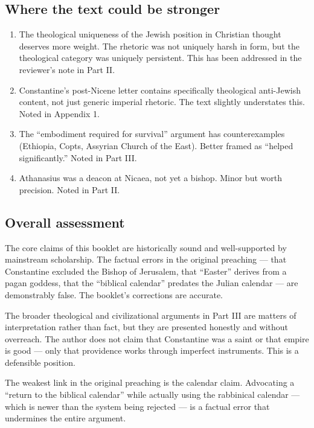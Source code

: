\documentclass[10pt,twoside,openany]{book}
\begin{document}
\subsection{Where the text could be stronger}

\begin{enumerate}[leftmargin=1.5em]
\item The theological uniqueness of the Jewish position in Christian
     thought deserves more weight. The rhetoric was not uniquely harsh
     in form, but the theological category was uniquely persistent.
     This has been addressed in the reviewer's note in Part II.

\item Constantine's post-Nicene letter contains specifically theological
     anti-Jewish content, not just generic imperial rhetoric. The text
     slightly understates this. Noted in Appendix 1.

\item The ``embodiment required for survival'' argument has
     counterexamples (Ethiopia, Copts, Assyrian Church of the East).
     Better framed as ``helped significantly.'' Noted in Part III.

\item Athanasius was a deacon at Nicaea, not yet a bishop. Minor but
     worth precision. Noted in Part II.
\end{enumerate}

\subsection{Overall assessment}

The core claims of this booklet are historically sound and well-supported by mainstream scholarship. The factual errors in the
original preaching --- that Constantine excluded the Bishop of
Jerusalem, that ``Easter'' derives from a pagan goddess, that the
``biblical calendar'' predates the Julian calendar --- are demonstrably
false. The booklet's corrections are accurate.

The broader theological and civilizational arguments in Part III are
matters of interpretation rather than fact, but they are presented
honestly and without overreach. The author does not claim that
Constantine was a saint or that empire is good --- only that providence
works through imperfect instruments. This is a defensible position.

The weakest link in the original preaching is the calendar claim.
Advocating a ``return to the biblical calendar'' while actually using
the rabbinical calendar --- which is newer than the system being
rejected --- is a factual error that undermines the entire argument.
\end{document}
